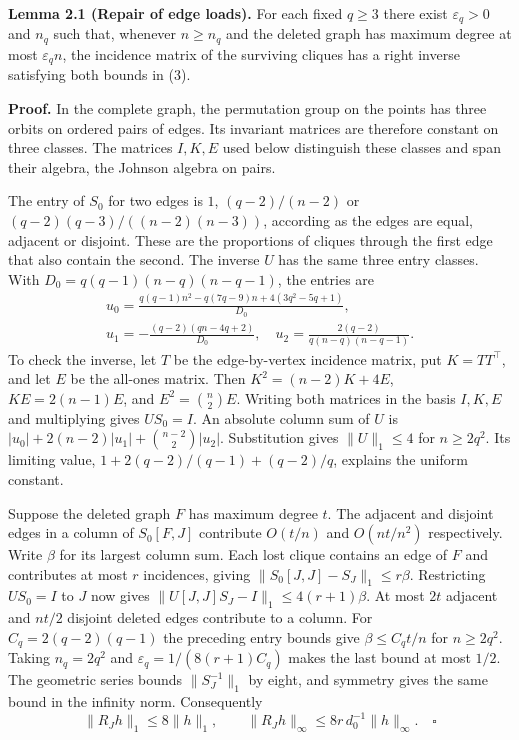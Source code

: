\documentclass[english,11pt,a4paper]{article}
\begin{document}
\textbf{Lemma 2.1 (Repair of edge loads).} For each fixed \(q\ge3\) there exist \(\varepsilon_q>0\) and \(n_q\) such that, whenever \(n\ge n_q\) and the deleted graph has maximum degree at most \(\varepsilon_q n\), the incidence matrix of the surviving cliques has a right inverse satisfying both bounds in (3).

\textbf{Proof.} In the complete graph, the permutation group on the points has three orbits on ordered pairs of edges. Its invariant matrices are therefore constant on three classes. The matrices \(I,K,E\) used below distinguish these classes and span their algebra, the Johnson algebra on pairs.

The entry of \(S_0\) for two edges is \(1\), \((q-2)/(n-2)\) or \((q-2)(q-3)/((n-2)(n-3))\), according as the edges are equal, adjacent or disjoint. These are the proportions of cliques through the first edge that also contain the second. The inverse \(U\) has the same three entry classes. With \(D_0=q(q-1)(n-q)(n-q-1)\), the entries are \[\begin{gathered}u_0=\frac{q(q-1)n^2-q(7q-9)n+4(3q^2-5q+1)}{D_0},\\[3pt]
 u_1=-\frac{(q-2)(qn-4q+2)}{D_0},\quad
 u_2=\frac{2(q-2)}{q(n-q)(n-q-1)} .\end{gathered}\] To check the inverse, let \(T\) be the edge-by-vertex incidence matrix, put \(K=TT^\top\), and let \(E\) be the all-ones matrix. Then \(K^2=(n-2)K+4E\), \(KE=2(n-1)E\), and \(E^2=\binom n2E\). Writing both matrices in the basis \(I,K,E\) and multiplying gives \(US_0=I\). An absolute column sum of \(U\) is \(|u_0|+2(n-2)|u_1|+\binom{n-2}2|u_2|\). Substitution gives \(\|U\|_1\le4\) for \(n\ge2q^2\). Its limiting value, \(1+2(q-2)/(q-1)+(q-2)/q\), explains the uniform constant.

Suppose the deleted graph \(F\) has maximum degree \(t\). The adjacent and disjoint edges in a column of \(S_0[F,J]\) contribute \(O(t/n)\) and \(O(nt/n^2)\) respectively. Write \(\beta\) for its largest column sum. Each lost clique contains an edge of \(F\) and contributes at most \(r\) incidences, giving \(\|S_0[J,J]-S_J\|_1\le r\beta\). Restricting \(US_0=I\) to \(J\) now gives \(\|U[J,J]S_J-I\|_1\le4(r+1)\beta\). At most \(2t\) adjacent and \(nt/2\) disjoint deleted edges contribute to a column. For \(C_q=2(q-2)(q-1)\) the preceding entry bounds give \(\beta\le C_q t/n\) for \(n\ge2q^2\). Taking \(n_q=2q^2\) and \(\varepsilon_q=1/(8(r+1)C_q)\) makes the last bound at most \(1/2\). The geometric series bounds \(\|S_J^{-1}\|_1\) by eight, and symmetry gives the same bound in the infinity norm. Consequently \[\|R_J h\|_1\le8\|h\|_1,\qquad
 \|R_J h\|_\infty\le 8r\,d_0^{-1}\|h\|_\infty . \quad\square\tag{3}\]
\end{document}
